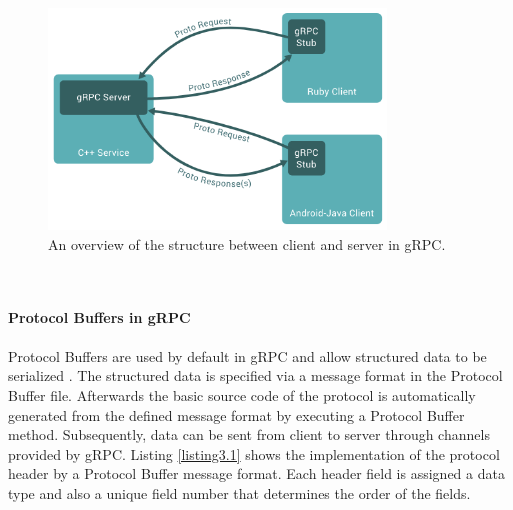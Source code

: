 \begin{figure}[tbp]
  \centering
  \includegraphics[width=0.8\textwidth]{images/grpc.png}
  \caption[gRPC Framework Structure]{An overview of the structure between client and server in gRPC.}
  \label{fig:gRPC_structure}
\end{figure}\\
\\
\textbf{Protocol Buffers in gRPC}
\\
\\
Protocol Buffers are used by default in gRPC and allow structured data to be serialized \cite{Proto}. %
The structured data is specified via a message format in the Protocol Buffer file. Afterwards the basic source code of the protocol is automatically generated from the defined message format by executing a Protocol Buffer method. Subsequently, data can be sent from client to server through channels provided by gRPC. Listing \ref{listing3.1} shows the implementation of the protocol header by a Protocol Buffer message format. Each header field is assigned a data type and also a unique field number that determines the order of the fields.\\


